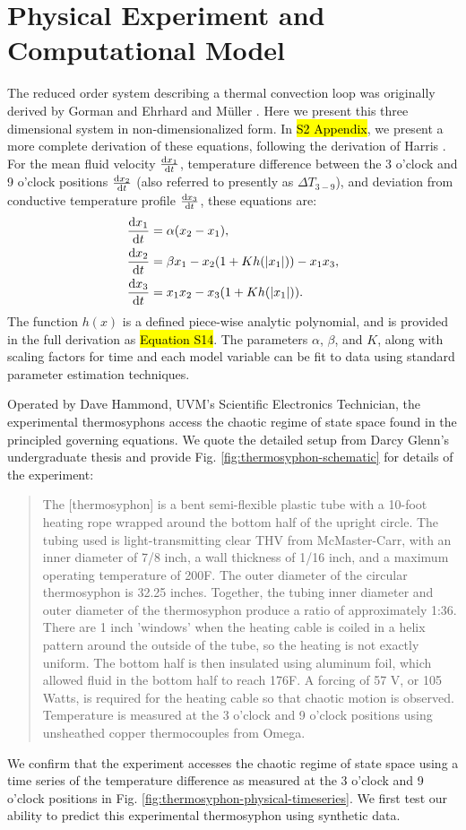 \documentclass[10pt,letterpaper]{article}
\newcommand{\diff}[2]{\frac{{\rm d}#1}{{\rm d}#2}}
\begin{document}
\section*{Physical Experiment and Computational Model}

The reduced order system describing a thermal convection loop was originally derived by Gorman \cite{gorman1986} and Ehrhard and M\"{u}ller \cite{ehrhard1990dynamical}.
Here we present this three dimensional system in non-dimensionalized form.
In \hl{S2 Appendix}, we present a more complete derivation of these equations, following the derivation of Harris \cite{harris2011predicting}.
For the mean fluid velocity $\diff{x_1}{t}$, temperature difference between the 3 o'clock and 9 o'clock positions $\diff{x_2}{t}$ (also referred to presently as $\Delta T_{3-9}$), and deviation from conductive temperature profile $\diff{x_3}{t}$, these equations are:
\begin{align}
& \diff{x_1}{t} = \alpha (x_2 - x_1),\\
& \diff{x_2}{t} = \beta x_1 - x_2 (1 + Kh(|x_1|)) - x_1x_3,\\
  & \diff{x_3}{t} = x_1x_2 - x_3 (1 + Kh(|x_1|)) .\end{align}
The function $h(x)$ is a defined piece-wise analytic polynomial, and is provided in the full derivation as \hl{Equation S14}.
The parameters $\alpha$, $\beta$, and $K$, along with scaling factors for time and each model variable can be fit to data using standard parameter estimation techniques.

Operated by Dave Hammond, UVM's Scientific Electronics Technician, the experimental thermosyphons access the chaotic regime of state space found in the principled governing equations.
We quote the detailed setup from Darcy Glenn's undergraduate thesis \cite{glenn2013} and provide Fig. \ref{fig:thermosyphon-schematic} for details of the experiment:
\begin{quote}
The [thermosyphon] is a bent semi-flexible plastic tube with a 10-foot heating rope wrapped around the bottom half of the upright circle.
The tubing used is light-transmitting clear THV from McMaster-Carr, with an inner diameter of 7/8 inch, a wall thickness of 1/16 inch, and a maximum operating temperature of 200F.
The outer diameter of the circular thermosyphon is 32.25 inches.
Together, the tubing inner diameter and outer diameter of the thermosyphon produce a ratio of approximately 1:36.
There are 1 inch 'windows' when the heating cable is coiled in a helix pattern around the outside of the tube, so the heating is not exactly uniform.
The bottom half is then insulated using aluminum foil, which allowed fluid in the bottom half to reach 176F.
A forcing of 57 V, or 105 Watts, is required for the heating cable so that chaotic motion is observed.
Temperature is measured at the 3 o'clock and 9 o'clock positions using unsheathed copper thermocouples from Omega.
\end{quote}
We confirm that the experiment accesses the chaotic regime of state space using a time series of the temperature difference as measured at the 3 o'clock and 9 o'clock positions in Fig. \ref{fig:thermosyphon-physical-timeseries}.
We first test our ability to predict this experimental thermosyphon using synthetic data.
\end{document}
